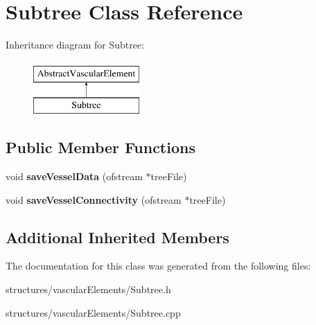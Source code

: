 \hypertarget{class_subtree}{}\section{Subtree Class Reference}
\label{class_subtree}
Inheritance diagram for Subtree\+:\begin{figure}[H]
\begin{center}
\leavevmode
\includegraphics[height=2.000000cm]{d8/dca/class_subtree}
\end{center}
\end{figure}
\subsection*{Public Member Functions}
\begin{DoxyCompactItemize}
\item 
\mbox{\label{class_subtree_a4dbc406967283b4d64736b80be593b3b}} 
void {\bfseries save\+Vessel\+Data} (ofstream $\ast$tree\+File)
\item 
\mbox{\label{class_subtree_a3acc9a402d7413e1fab3dc5eb3999e5e}} 
void {\bfseries save\+Vessel\+Connectivity} (ofstream $\ast$tree\+File)
\end{DoxyCompactItemize}
\subsection*{Additional Inherited Members}


The documentation for this class was generated from the following files\+:\begin{DoxyCompactItemize}
\item 
structures/vascular\+Elements/Subtree.\+h\item 
structures/vascular\+Elements/Subtree.\+cpp\end{DoxyCompactItemize}
